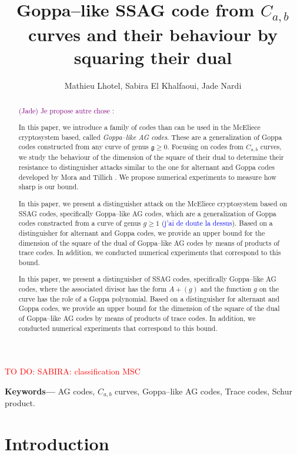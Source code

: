 \documentclass[a4paper]{article}
\title{Goppa--like SSAG code from $C_{a,b}$ curves and their behaviour by squaring their dual}
\author{Mathieu Lhotel, Sabira El Khalfaoui, Jade Nardi}
\date{}
\theoremstyle{definition}
\theoremstyle{remark}
\newcommand\jade[1]{\textcolor{purple}{#1}}
\newcommand\TODO[1]{\textcolor{red}{TO DO: #1}}
\newcommand\sabira[1]{\textcolor{blue}{#1}}
\providecommand{\keywords}[1]{\textbf{Keywords---} #1}
\begin{document}

\maketitle

\TODO{SABIRA: classification MSC}
\begin{abstract}
	\jade{(Jade) Je propose autre chose :}
	
	In this paper, we introduce a family of codes than can be used in the McEliece cryptosystem based, called \emph{Goppa--like AG codes}. These are a generalization of Goppa codes constructed from any curve of genus $\mathfrak{g} \geq 0$. Focusing on codes from $C_{a,b}$ curves, we study the behaviour of the dimension of the square of their dual to determine their resistance to distinguisher attacks similar to the one for alternant and Goppa codes developed by Mora and Tillich \cite{MT21}. We propose numerical experiments to measure how sharp is our bound.
	
	\bigskip
	
	In this paper, we present a distinguisher attack on the McEliece cryptosystem based on SSAG codes, specifically Goppa--like AG codes, which are a generalization of Goppa codes constracted from a curve of genus $g \geq 1$ (\sabira{j'ai de doute la dessus}). Based on a distinguisher for alternant and Goppa codes, we provide an upper bound for the dimension of the square of the dual of Goppa--like AG codes by means of products of trace codes. In addition, we conducted numerical experiments that correspond to this bound.
	\vskip 0.5cm
	
	In this paper, we present a distinguisher of SSAG codes, specifically Goppa--like AG codes, where the associated divisor has the form $A+(g)$ and the function $g$ on the curve has the role of a Goppa polynomial. Based on a distinguisher for alternant and Goppa codes, we provide an upper bound for the dimension of the square of the dual of Goppa--like AG codes by means of products of trace codes. In addition, we conducted numerical experiments that correspond to this bound.
\end{abstract}

\keywords{AG codes, $C_{a,b}$ curves, Goppa--like AG codes, Trace codes, Schur product.}

\section*{Introduction}
\end{document}
